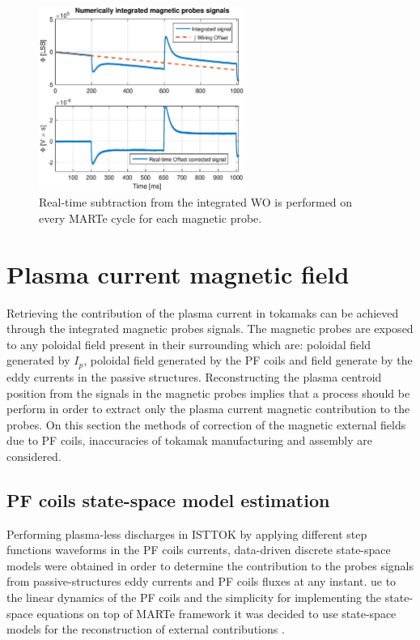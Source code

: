 \begin{figure}[htbp]
	\centering
	\includegraphics[width=0.6\textwidth]{Chp4/offset_remov_1}
	\caption{\label{offset_remove} Real-time subtraction from the integrated WO is performed on every MARTe cycle for each magnetic probe.  }
\end{figure}

%


\section{Plasma current magnetic field }

Retrieving the contribution of the plasma current in tokamaks can be achieved through the integrated magnetic probes signals. The magnetic probes are exposed to any poloidal field present in their surrounding which are: poloidal field generated by $I_p$, poloidal field generated by the PF coils and field generate by the eddy currents in the passive structures. Reconstructing the plasma centroid position from the signals in the magnetic probes implies that a process should be perform in order to extract only the plasma current magnetic contribution to the probes.  On this section the methods of correction of the magnetic external fields due to PF coils, inaccuracies of tokamak manufacturing and assembly are considered. \smallskip





\subsection{PF coils state-space model estimation}
Performing plasma-less discharges in ISTTOK by applying different step functions waveforms in the PF coils currents,  data-driven discrete state-space models were obtained in order to determine the contribution to the probes signals from passive-structures eddy currents and PF coils fluxes at any instant. ue to the linear dynamics of the PF coils and the simplicity for implementing the state-space equations on top of MARTe framework it was decided to use state-space models for the reconstruction of external contributions \cite[Chapter~2]{Chen1999}.\smallskip

